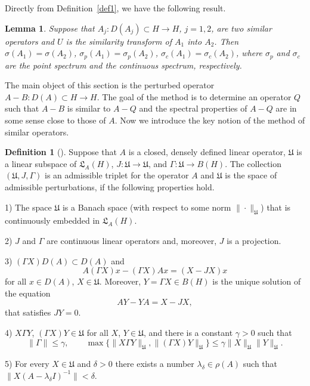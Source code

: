 \documentclass[11pt,centertags,reqno,twoside]{amsart}
\numberwithin{equation}{section}
\newtheorem{lemma}[theorem]{Lemma}
\theoremstyle{definition}
\newtheorem{definition}[theorem]{Definition}
\theoremstyle{remark}
\begin{document}
Directly from Definition~\ref{def1}, we have the following result.
\begin{lemma}\label{lemsim}
Suppose that $A_j: D(A_j)\subset H\to H$, $j=1, 2$, are two similar operators
and $U$ is the similarity transform of $A_1$ into $A_2$. Then
$\sigma(A_1)=\sigma(A_2)$, $\sigma_p(A_1)=\sigma_p(A_2)$, $\sigma_c(A_1)=\sigma_c(A_2)$,
where $\sigma_p$ and $\sigma_c$ are the point spectrum and the continuous spectrum,
respectively.
\end{lemma}

The main object of this section is the perturbed operator $A-B: D(A)\subset H\to H$.
The goal of the method is to determine an operator $Q$ such that $A-B$ is similar
to $A-Q$ and the spectral properties of $A-Q$ are in some sense close to those of $A$.
Now we introduce the key notion of the method of similar operators.
\begin{definition}[\cite{BaskKrUsk}]\label{defadm}
Suppose that $A$ is a closed, densely defined linear operator, $\mathfrak{U}$
is a linear subspace of $\mathfrak{L}_A(H)$, $J:\mathfrak{U}\to\mathfrak{U}$,
and $\Gamma:\mathfrak{U}\to B(H)$. The collection $(\mathfrak{U}, J, \Gamma)$ is an
admissible triplet for the operator $A$ and $\mathfrak{U}$ is the space of
admissible perturbations, if the following properties hold.

1) The space $\mathfrak{U}$ is a Banach space (with respect to some norm
$\|\cdot\|_{\mathfrak{U}}$) that is continuously embedded in $\mathfrak{L}_A(H)$.

2) $J$ and $\Gamma$ are continuous linear operators and, moreover, $J$ is a projection.

3) $(\Gamma X)D(A)\subset D(A)$ and
\begin{equation}\label{adA}
A(\Gamma X)x-(\Gamma X)Ax=(X-JX)x
\end{equation}
for all $x\in D(A)$, $X\in\mathfrak{U}$. Moreover, $Y=\Gamma X\in B(H)$
is the unique solution of the equation
\[
AY-YA=X-JX,
\]
that satisfies $JY=0$.

4) $X\Gamma Y$, $(\Gamma X)Y\in\mathfrak{U}$ for all $X$, $Y\in\mathfrak{U}$,
and there is a constant $\gamma>0$ such that
\[
\|\Gamma\|\leqslant \gamma, \qquad \max\{\|X\Gamma Y\|_{\mathfrak{U}},
\|(\Gamma X)Y\|_{\mathfrak{U}}\}\leqslant \gamma\|X\|_{\mathfrak{U}}\|Y\|_{\mathfrak{U}}.
\]

5) For every $X\in\mathfrak{U}$ and $\delta>0$ there exists a number
$\lambda_\delta\in\rho(A)$ such that~$\|X(A-\lambda_\delta I)^{-1}\|<\delta$.
\end{definition}
\end{document}
